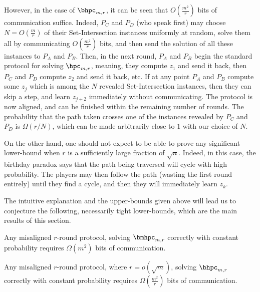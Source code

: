 However, in the case of $\bhpc_{m,r}$, it can be seen that $O(\frac{m^2}{r})$ bits of communication suffice. Indeed, $P_C$ and $P_D$ (who speak first) may choose $N = O(\frac{m}{r})$ of their Set-Intersection instances uniformly at random, solve them all by communicating $O(\frac{m^2}{r})$ bits, and then send the solution of all these instances to $P_A$ and $P_B$. Then, in the next round, $P_A$ and $P_B$ begin the standard protocol for solving $\hpc_{m,r}$, meaning, they compute $z_1$ and send it back, then $P_C$ and $P_D$ compute $z_2$ and send it back, etc. If at any point $P_A$ and $P_B$ compute some $z_j$ which is among the $N$ revealed Set-Intersection instances, then they can skip a step, and learn $z_{j+2}$ immediately without communicating. The protocol is now aligned, and can be finished within the remaining number of rounds. The probability that the path taken crosses one of the instances revealed by $P_C$ and $P_D$ is $\Omega(r/ N)$, which can be made arbitrarily close to $1$ with our choice of $N$.

On the other hand, one should not expect to be able to prove any significant lower-bound when $r$ is a sufficiently large fraction of $\sqrt n$. Indeed, in this case, the birthday paradox says that the path being traversed will cycle with high probability. The players may then follow the path (wasting the first round entirely) until they find a cycle, and then they will immediately learn $z_k$.

\medskip\noindent
The intuitive explanation and the upper-bounds given above will lead us to conjecture the following, necessarily tight lower-bounds, which are the main results of this section.

 \begin{theorem} \label{thm:lb-mhpc}
 Any misaligned $r$-round protocol, solving $\bmhpc_{m,r}$ correctly with constant probability requires $\Omega(m^2)$ bits of communication.
 \end{theorem}
 
 \begin{theorem} \label{thm:lb-hpc}
Any misaligned $r$-round protocol, where $r = o(\sqrt m)$, solving $\bhpc_{m,r}$ correctly with constant probability requires $\Omega(\frac{m^2}{r})$ bits of communication.
 \end{theorem}


